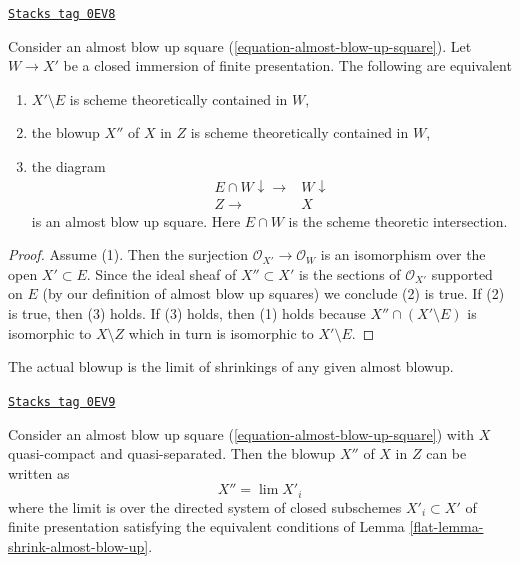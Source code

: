 \begin{lemma}
\label{flat-lemma-shrink-almost-blow-up}
\href{https://stacks.math.columbia.edu/tag/0EV8}{\texttt{Stacks tag 0EV8}}

Consider an almost blow up square (\ref{equation-almost-blow-up-square}).
Let $W \to X'$ be a closed immersion of finite presentation.
The following are equivalent
\begin{enumerate}
\item $X' \setminus E$ is scheme theoretically contained in $W$,
\item the blowup $X''$ of $X$ in $Z$ is scheme theoretically contained in $W$,
\item the diagram
$$
\begin{array}{cc}E \cap W \downarrow\longrightarrow & W \downarrow \\ Z \longrightarrow & X\end{array}
$$
is an almost blow up square. Here $E \cap W$ is the
scheme theoretic intersection.
\end{enumerate}
\end{lemma}

\begin{proof}
Assume (1). Then the surjection $\mathcal{O}_{X'} \to \mathcal{O}_W$
is an isomorphism over the open $X' \subset E$. Since the ideal sheaf
of $X'' \subset X'$ is the sections of $\mathcal{O}_{X'}$ supported on $E$
(by our definition of almost blow up squares)
we conclude (2) is true. If (2) is true, then (3) holds.
If (3) holds, then (1) holds because $X'' \cap (X' \setminus E)$
is isomorphic to $X \setminus Z$ which in turn is isomorphic
to $X' \setminus E$.
\end{proof}

The actual blowup is the limit of shrinkings of any given almost blowup.

\begin{lemma}
\label{flat-lemma-blow-up-limit-almost-blow-up}
\href{https://stacks.math.columbia.edu/tag/0EV9}{\texttt{Stacks tag 0EV9}}

Consider an almost blow up square (\ref{equation-almost-blow-up-square})
with $X$ quasi-compact and quasi-separated. Then the blowup $X''$ of $X$
in $Z$ can be written as
$$
X'' = \lim X'_i
$$
where the limit is over the directed system of closed subschemes
$X'_i \subset X'$ of finite presentation satisfying the equivalent
conditions of Lemma \ref{flat-lemma-shrink-almost-blow-up}.
\end{lemma}

